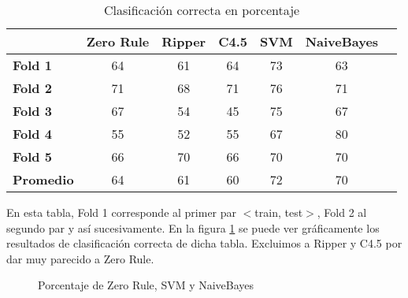 \begin{table}[H]
	\centering
	\begin{tabular}{|l|c|c|c|c|c|c|}
		\hline
		\textbf{}  & \textbf{Zero Rule} & \textbf{Ripper} & \textbf{C4.5} & \textbf{SVM} & \textbf{NaiveBayes} \\ \hline
		\textbf{Fold 1}  & 64 & 61 & 64 & 73 & 63 \\ \hline
		\textbf{Fold 2}  & 71 & 68 & 71 & 76 & 71 \\ \hline
		\textbf{Fold 3}  & 67 & 54 & 45 & 75 & 67 \\ \hline
		\textbf{Fold 4}  & 55 & 52 & 55 & 67 & 80 \\ \hline
		\textbf{Fold 5}  & 66 & 70 & 66 & 70 & 70 \\ \hline
		\hline \hline
		\textbf{Promedio} & 64 & 61 & 60 & 72 & 70 \\ \hline
	\end{tabular}
	\caption{Clasificación correcta en porcentaje}
	\label{class_corr_en_pct}
\end{table}

En esta tabla, Fold 1 corresponde al primer par $<$train, test$>$, Fold 2 al segundo par y así sucesivamente. En la figura \ref{porcentajexClasificador} se puede ver gráficamente los resultados de clasificación correcta de dicha tabla. Excluimos a Ripper y C4.5 por dar muy parecido a Zero Rule.

\begin{figure}[H]
	\centering
	\caption{Porcentaje de Zero Rule, SVM y NaiveBayes}
	\label{porcentajexClasificador}
\end{figure}

